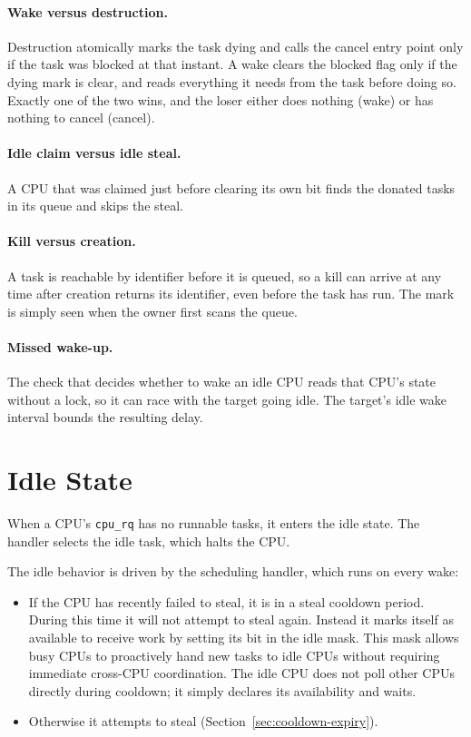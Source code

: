 \documentclass[11pt]{article}
\begin{document}
\paragraph{Wake versus destruction.}
Destruction atomically marks the task dying and calls the cancel entry point only if the task was blocked at that instant.
A wake clears the blocked flag only if the dying mark is clear, and reads everything it needs from the task before doing so.
Exactly one of the two wins, and the loser either does nothing (wake) or has nothing to cancel (cancel).

\paragraph{Idle claim versus idle steal.}
A CPU that was claimed just before clearing its own bit finds the donated tasks in its queue and skips the steal.

\paragraph{Kill versus creation.}
A task is reachable by identifier before it is queued, so a kill can arrive at any time after creation returns its identifier, even before the task has run.
The mark is simply seen when the owner first scans the queue.

\paragraph{Missed wake-up.}
The check that decides whether to wake an idle CPU reads that CPU's state without a lock, so it can race with the target going idle.
The target's idle wake interval bounds the resulting delay.

\section{Idle State}
\label{sec:idle-state}

When a CPU's \texttt{cpu\_rq} has no runnable tasks, it enters the idle state.
The handler selects the idle task, which halts the CPU.

The idle behavior is driven by the scheduling handler, which runs on every wake:

\begin{itemize}
	\item If the CPU has recently failed to steal, it is in a steal cooldown period.
	      During this time it will not attempt to steal again.
	      Instead it marks itself as available to receive work by setting its bit in the idle mask.
	      This mask allows busy CPUs to proactively hand new tasks to idle CPUs without requiring immediate cross-CPU coordination.
	      The idle CPU does not poll other CPUs directly during cooldown; it simply declares its availability and waits.
	\item Otherwise it attempts to steal (Section~\ref{sec:cooldown-expiry}).
\end{itemize}
\end{document}

